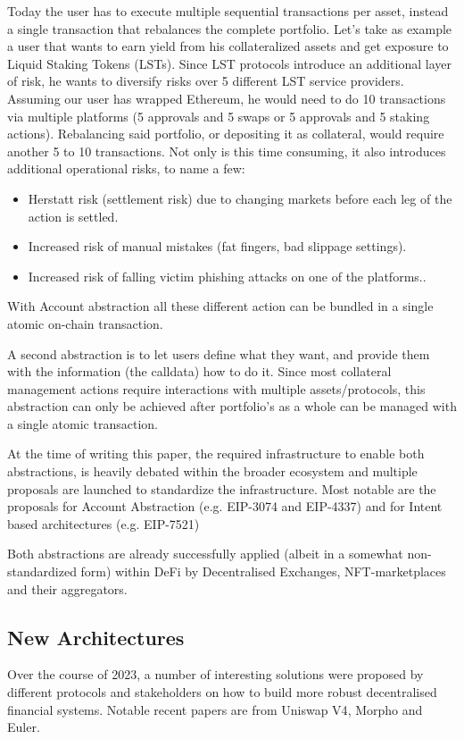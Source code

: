 \documentclass[sigconf,nonacm]{acmart}
\begin{document}
Today the user has to execute multiple sequential transactions per asset, instead a single transaction that rebalances the complete portfolio.
Let's take as example a user that wants to earn yield from his collateralized assets and get exposure to Liquid Staking Tokens (LSTs).
Since LST protocols introduce an additional layer of risk, he wants to diversify risks over 5 different LST service providers.
Assuming our user has wrapped Ethereum, he would need to do 10 transactions via multiple platforms (5 approvals and 5 swaps or 5 approvals and 5 staking actions).
Rebalancing said portfolio, or depositing it as collateral, would require another 5 to 10 transactions.
Not only is this time consuming, it also introduces additional operational risks, to name a few:
 \begin{itemize}
    \item Herstatt risk (settlement risk) due to changing markets before each leg of the action is settled.
    \item Increased risk of manual mistakes (fat fingers, bad slippage settings).
    \item Increased risk of falling victim phishing attacks on one of the platforms.. 
\end{itemize}
With Account abstraction all these different action can be bundled in a single atomic on-chain transaction.

A second abstraction is to let users define what they want, and provide them with the information (the calldata) how to do it.
Since most collateral management actions require interactions with multiple assets/protocols,
this abstraction can only be achieved after portfolio's as a whole can be managed with a single atomic transaction.

At the time of writing this paper, the required infrastructure to enable both abstractions, is heavily debated within the broader ecosystem and multiple proposals are launched to standardize the infrastructure.
Most notable are the proposals for Account Abstraction (e.g. EIP-3074 and EIP-4337) and for Intent based architectures (e.g. EIP-7521)

Both abstractions are already successfully applied (albeit in a somewhat non-standardized form) within DeFi by Decentralised Exchanges, NFT-marketplaces and their aggregators.

\subsection{New Architectures}
\label{subsec:new-architectures}
Over the course of 2023, a number of interesting solutions were proposed by different protocols and stakeholders on how to build more robust decentralised financial systems.
Notable recent papers are from Uniswap V4\cite{adams2023uniswap}, Morpho\cite{gontier2023morpho} and Euler\cite{euler2023protocols}.
\end{document}
